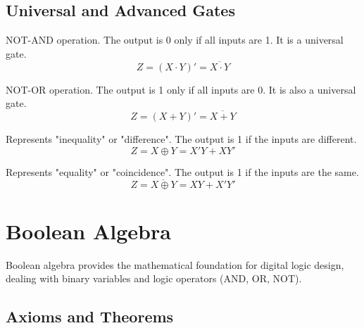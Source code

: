\subsection{Universal and Advanced Gates}

\begin{vocabulary}[NAND]
NOT-AND operation. The output is 0 only if all inputs are 1. It is a universal gate.
\begin{equation}
Z = (X \cdot Y)' = \overline{X \cdot Y}
\end{equation}
\end{vocabulary}

\begin{vocabulary}[NOR]
NOT-OR operation. The output is 1 only if all inputs are 0. It is also a universal gate.
\begin{equation}
Z = (X + Y)' = \overline{X + Y}
\end{equation}
\end{vocabulary}

\begin{vocabulary}
Represents "inequality" or "difference". The output is 1 if the inputs are different.
\begin{equation}
Z = X \oplus Y = X'Y + XY'
\end{equation}
\end{vocabulary}

\begin{vocabulary}
Represents "equality" or "coincidence". The output is 1 if the inputs are the same.
\begin{equation}
Z = \overline{X \oplus Y} = XY + X'Y'
\end{equation}
\end{vocabulary}

\section{Boolean Algebra}

\begin{definition}
Boolean algebra provides the mathematical foundation for digital logic design, dealing with binary variables and logic operators (AND, OR, NOT).
\end{definition}

\subsection{Axioms and Theorems}

